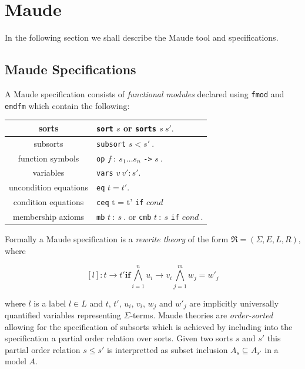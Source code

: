 \section{Maude}
In the following section we shall describe the Maude tool and specifications. 
\subsection{Maude Specifications}

A Maude specification consists of \emph{functional modules} declared using \texttt{fmod} and \texttt{endfm} which contain the following:

\medskip
\begin{center}
\begin{tabular}{| c | l |}
\hline
sorts    & \texttt{sort} $s$ or \texttt{sorts}  $s \ s' .$ \\ \hline
subsorts  & \texttt{subsort} $s < s' \ .$ \\ \hline
function symbols  & \texttt{op} $f \ :  \ s_1 \ldots s_n$ \texttt{->} $s \ .$ \\ \hline
variables  & \texttt{vars} $v \ v' : s' .$\\ \hline
uncondition equations  &\texttt{eq} $t = t' .$\\ \hline
condition equations & \texttt{ceq} t = t' \texttt{if} $cond$ \\ \hline
membership axioms & \texttt{mb} $t \ : \ s \ .$ or \texttt{cmb} $t  \ : \ s$ \texttt{if} $cond \ .$  \\ \hline
\end{tabular}
\end{center}


Formally a Maude specification is a \emph{rewrite theory} of the form $\mathfrak{R}=(\Sigma,E,L,R)$, where 

$$ [l] : t \to t' \mathbf{if} \bigwedge^{n}_{i = 1} u_i \to v_i \bigwedge^{m}_{j = 1} w_j = w'_j $$

where $l$ is a label $l \in L$ and $t$, $t'$, $u_i$, $v_i$, $w_j$ and $w'_j$ are implicitly universally quantified variables representing $\Sigma$-terms. Maude theories are \emph{order-sorted} allowing for the specification of subsorts which is achieved by including into the specification a partial order relation over sorts. Given two sorts $s$ and $s'$ this partial order relation $s \leq s'$ is interpretted as subset inclusion $A_s \subseteq A_{s'}$ in a model $A$.


